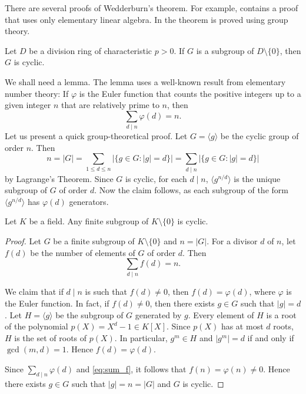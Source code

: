 There are several proofs of Wedderburn's theorem. 
For example, \cite{MR360687} contains a proof that uses only 
elementary linear algebra. In \cite[Chapter 14]{MR896269}
the theorem is proved using group theory. 

\begin{theorem}
\label{thm:division}
    Let $D$ be a division ring of characteristic $p>0$. 
    If $G$ is a subgroup of $D\setminus\{0\}$, then 
    $G$ is cyclic. 
\end{theorem}

We shall need a lemma. The lemma 
uses a well-known result from elementary number theory:
If $\varphi$ is the Euler function that 
counts the positive integers up to a given integer $n$ 
that are relatively prime to $n$, then 
\[
\sum_{d\mid n}\varphi(d)=n.
\]
Let us present a quick group-theoretical proof. 
Let $G=\langle g\rangle$ be the cyclic group of order $n$.
Then 
\[
n=|G|=\sum_{1\leq d\leq n}|\{g\in G:|g|=d\}|
=\sum_{d\mid n}|\{g\in G:|g|=d\}|
\]
by Lagrange's Theorem. Since $G$ is cyclic, 
for each $d\mid n$, 
$\langle g^{n/d}\rangle$ is the 
unique subgroup of $G$ of order $d$. Now the claim follows, 
as each subgroup
of the form $\langle g^{n/d}\rangle$ has $\varphi(d)$ 
generators. 

\begin{lemma}
    Let $K$ be a field. 
    Any finite subgroup of $K\setminus\{0\}$ is cyclic. 
\end{lemma}

\begin{proof}
    Let $G$ be a finite subgroup of $K\setminus\{0\}$ and
    $n=|G|$. For a divisor $d$ of $n$, let
    $f(d)$ be the number of elements of $G$ of order $d$. 
    Then 
    \begin{equation}
    \label{eq:sum_f}
    \sum_{d\mid n}f(d)=n.
    \end{equation}
    
    We claim that if $d\mid n$ is such that
    $f(d)\ne0$, then $f(d)=\varphi(d)$, where $\varphi$ is
    the Euler function. In fact, if $f(d)\ne 0$, 
    then there exists $g\in G$ such that $|g|=d$. Let 
    $H=\langle g\rangle$ be the subgroup of $G$ generated by $g$.
    Every element of $H$ is a root of the polynomial
    $p(X)=X^d-1\in K[X]$. Since $p(X)$ has at most $d$ roots, 
    $H$ is the set of roots of $p(X)$. In particular, 
    $g^m\in H$ and $|g^m|=d$ if and only if $\gcd(m,d)=1$. Hence
    $f(d)=\varphi(d)$.

    Since $\sum_{d\mid n}\varphi(d)$ and \eqref{eq:sum_f}, 
    it follows that $f(n)=\varphi(n)\ne0$.
    Hence there exists $g\in G$ such that 
    $|g|=n=|G|$ and $G$ is cyclic.
\end{proof}

